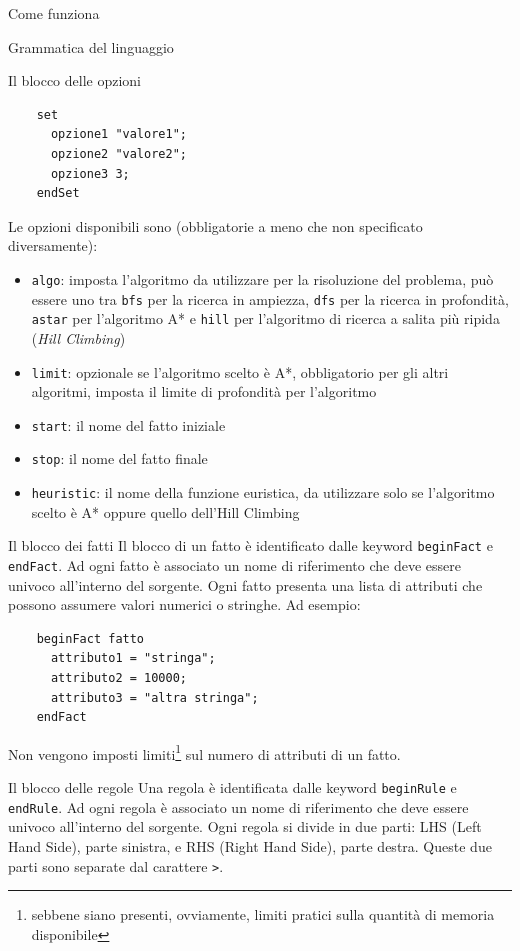 \begin{chapter}{Come funziona}
\begin{section}{Grammatica del linguaggio}
\begin{subsection}{Il blocco delle opzioni}
	\begin{verbatim}
	set
	  opzione1 "valore1";
	  opzione2 "valore2";
	  opzione3 3;
	endSet
	\end{verbatim}

	\noindent Le opzioni disponibili sono (obbligatorie a meno che non specificato diversamente):
	\begin{itemize}
		\item \verb,algo,: imposta l'algoritmo da utilizzare per la risoluzione del problema, pu\`o
		essere uno tra \verb,bfs, per la ricerca in ampiezza, \verb,dfs, per la ricerca in profondit\`a,
		\verb,astar, per l'algoritmo A* e \verb,hill, per l'algoritmo di ricerca a salita pi\`u
		ripida (\textit{Hill Climbing})
		\item \verb,limit,: opzionale se l'algoritmo scelto \`e A*, obbligatorio per gli altri algoritmi,
		imposta il limite di profondit\`a per l'algoritmo
		\item \verb,start,: il nome del fatto iniziale
		\item \verb,stop,: il nome del fatto finale
		\item \verb,heuristic,: il nome della funzione euristica, da utilizzare solo se l'algoritmo
		scelto \`e A* oppure quello dell'Hill Climbing
	\end{itemize}
	\end{subsection}

	\begin{subsection}{Il blocco dei fatti}
	Il blocco di un fatto \`e identificato dalle keyword \verb,beginFact, e \verb,endFact,. Ad
	ogni fatto \`e associato un nome di riferimento che deve essere univoco all'interno del
	sorgente. Ogni fatto presenta una lista di attributi che possono assumere valori numerici
	o stringhe. Ad esempio:

	\begin{verbatim}
	beginFact fatto
	  attributo1 = "stringa";
	  attributo2 = 10000;
	  attributo3 = "altra stringa";
	endFact
	\end{verbatim}

	\noindent Non vengono imposti limiti\footnote{sebbene siano presenti, ovviamente, limiti pratici
    sulla quantit\`a di memoria disponibile} sul numero di attributi di un fatto.
	\end{subsection}

	\begin{subsection}{Il blocco delle regole}
	Una regola \`e identificata dalle keyword \verb,beginRule, e \verb,endRule,. Ad
	ogni regola \`e associato un nome di riferimento che deve essere univoco all'interno del
	sorgente. Ogni regola si divide in due parti: LHS (Left Hand Side), parte sinistra, e RHS
	(Right Hand Side), parte destra. Queste due parti sono separate dal carattere \verb,>,.


\end{subsection}
\end{section}
\end{chapter}
